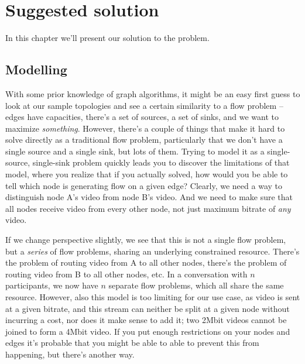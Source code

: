 \chapter{Suggested solution}
\label{chp:suggested-solution}

In this chapter we'll present our solution to the problem.

\section{Modelling}

With some prior knowledge of graph algorithms, it might be an easy first guess to look at our sample topologies and see a certain similarity to a flow problem -- edges have capacities, there's a set of sources, a set of sinks, and we want to maximize \emph{something}. However, there's a couple of things that make it hard to solve directly as a traditional flow problem, particularly that we don't have a single source and a single sink, but lots of them. Trying to model it as a single-source, single-sink problem quickly leads you to discover the limitations of that model, where you realize that if you actually solved, how would you be able to tell which node is generating flow on a given edge? Clearly, we need a way to distinguish node A's video from node B's video. And we need to make sure that all nodes receive video from every other node, not just maximum bitrate of \emph{any} video.

If we change perspective slightly, we see that this is not a single flow problem, but a \emph{series} of flow problems, sharing an underlying constrained resource. There's the problem of routing video from A to all other nodes, there's the problem of routing video from B to all other nodes, etc. In a conversation with $n$ participants, we now have $n$ separate flow problems, which all share the same resource. However, also this model is too limiting for our use case, as video is sent at a given bitrate, and this stream can neither be split at a given node without incurring a cost, nor does it make sense to add it; two 2Mbit videos cannot be joined to form a 4Mbit video. If you put enough restrictions on your nodes and edges it's probable that you might be able to able to prevent this from happening, but there's another way.

